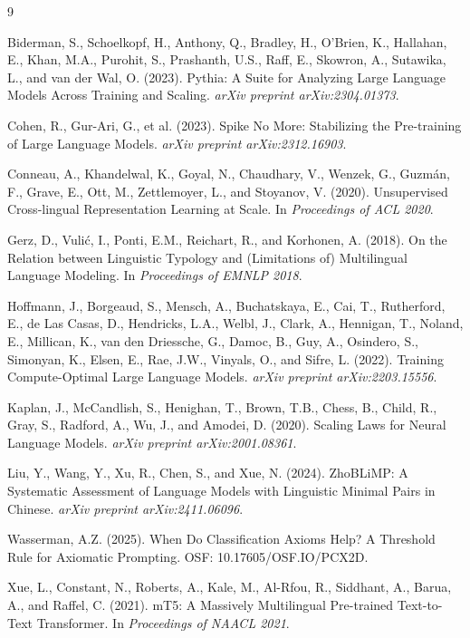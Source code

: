 \documentclass[11pt,a4paper]{article}
\begin{document}

\begin{thebibliography}{9}

Biderman, S., Schoelkopf, H., Anthony, Q., Bradley, H., O'Brien, K., Hallahan, E., Khan, M.A., Purohit, S., Prashanth, U.S., Raff, E., Skowron, A., Sutawika, L., and van der Wal, O. (2023).
\newblock Pythia: A Suite for Analyzing Large Language Models Across Training and Scaling.
\newblock \textit{arXiv preprint arXiv:2304.01373}.

Cohen, R., Gur-Ari, G., et al. (2023).
\newblock Spike No More: Stabilizing the Pre-training of Large Language Models.
\newblock \textit{arXiv preprint arXiv:2312.16903}.

Conneau, A., Khandelwal, K., Goyal, N., Chaudhary, V., Wenzek, G., Guzm\'{a}n, F., Grave, E., Ott, M., Zettlemoyer, L., and Stoyanov, V. (2020).
\newblock Unsupervised Cross-lingual Representation Learning at Scale.
\newblock In \textit{Proceedings of ACL 2020}.

Gerz, D., Vuli\'{c}, I., Ponti, E.M., Reichart, R., and Korhonen, A. (2018).
\newblock On the Relation between Linguistic Typology and (Limitations of) Multilingual Language Modeling.
\newblock In \textit{Proceedings of EMNLP 2018}.

Hoffmann, J., Borgeaud, S., Mensch, A., Buchatskaya, E., Cai, T., Rutherford, E., de Las Casas, D., Hendricks, L.A., Welbl, J., Clark, A., Hennigan, T., Noland, E., Millican, K., van den Driessche, G., Damoc, B., Guy, A., Osindero, S., Simonyan, K., Elsen, E., Rae, J.W., Vinyals, O., and Sifre, L. (2022).
\newblock Training Compute-Optimal Large Language Models.
\newblock \textit{arXiv preprint arXiv:2203.15556}.

Kaplan, J., McCandlish, S., Henighan, T., Brown, T.B., Chess, B., Child, R., Gray, S., Radford, A., Wu, J., and Amodei, D. (2020).
\newblock Scaling Laws for Neural Language Models.
\newblock \textit{arXiv preprint arXiv:2001.08361}.

Liu, Y., Wang, Y., Xu, R., Chen, S., and Xue, N. (2024).
\newblock ZhoBLiMP: A Systematic Assessment of Language Models with Linguistic Minimal Pairs in Chinese.
\newblock \textit{arXiv preprint arXiv:2411.06096}.

Wasserman, A.Z. (2025).
\newblock When Do Classification Axioms Help? A Threshold Rule for Axiomatic Prompting.
\newblock OSF: 10.17605/OSF.IO/PCX2D.

Xue, L., Constant, N., Roberts, A., Kale, M., Al-Rfou, R., Siddhant, A., Barua, A., and Raffel, C. (2021).
\newblock mT5: A Massively Multilingual Pre-trained Text-to-Text Transformer.
\newblock In \textit{Proceedings of NAACL 2021}.

\end{thebibliography}
\end{document}
